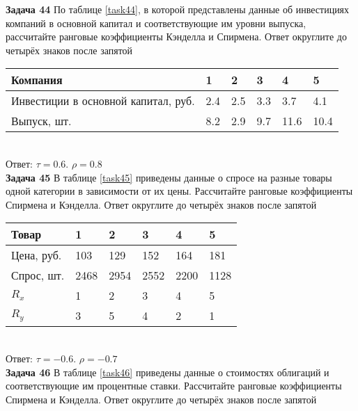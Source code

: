 \documentclass{article}
\begin{document}
\textbf{Задача 44} По таблице \ref{task44}, в которой представлены данные об инвестициях компаний в основной капитал и соответствующие им уровни выпуска, рассчитайте ранговые коэффициенты Кэнделла и Спирмена. Ответ округлите до четырёх знаков после запятой\\

\begin{minipage}{\textwidth}
\centering
\begin{tabularx}{0.8\textwidth}{lYYYYY}
\toprule
Компания & 1 & 2 & 3 & 4 & 5 \\
\midrule
Инвестиции в основной капитал, руб. & 2.4 & 2.5 & 3.3 & 3.7 & 4.1 \\

Выпуск, шт. & 8.2 & 2.9 & 9.7 & 11.6 & 10.4 \\
\bottomrule
\end{tabularx}
\label{task44}
\end{minipage} \\[35pt]

Ответ: $\tau = 0.6$. $\rho = 0.8$\\

\textbf{Задача 45} В таблице \ref{task45} приведены данные о спросе на разные товары одной категории в зависимости от их цены. Рассчитайте ранговые коэффициенты Спирмена и Кэнделла. Ответ округлите до четырёх знаков после запятой\\

\begin{minipage}{\textwidth}
\centering
\begin{tabularx}{0.8\textwidth}{lYYYYY}
\toprule
Товар & 1 & 2 & 3 & 4 & 5 \\
\midrule
Цена, руб. & 103 & 129 & 152 & 164 & 181 \\

Спрос, шт. & 2468 & 2954 & 2552 & 2200 & 1128 \\

$R_x$ & 1 & 2 & 3 & 4 & 5 \\

$R_y$ & 3 & 5 & 4 & 2 & 1 \\
\bottomrule
\end{tabularx}
\label{task45}
\end{minipage} \\[35pt]

Ответ: $\tau = -0.6$. $\rho = -0.7$\\

\textbf{Задача 46} В таблице \ref{task46} приведены данные о стоимостях облигаций и соответствующие им процентные ставки. Рассчитайте ранговые коэффициенты Спирмена и Кэнделла. Ответ округлите до четырёх знаков после запятой\\
\end{document}
